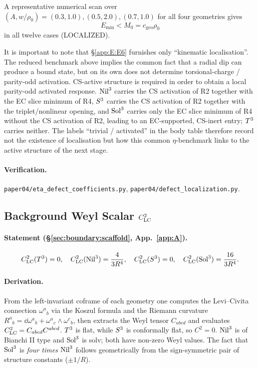 A representative numerical scan over $(A, w/\rho_0) = (0.3, 1.0), (0.5, 2.0),
(0.7, 1.0)$ for all four geometries gives
\begin{equation}
  E_{\min} < M_0 = c_{\mathrm{geo}}\rho_0
\end{equation}
in all twelve cases (LOCALIZED).

It is important to note that \S\ref{app:E:E6} furnishes only ``kinematic
localisation''.  The reduced benchmark above implies the common fact that
a radial dip can produce a bound state, but on its own does not determine
torsional-charge / parity-odd activation.  CS-active structure is required
in order to obtain a local parity-odd activated response.  $\mathrm{Nil}^3$
carries the CS activation of R2 together with the EC slice minimum of R4,
$S^3$ carries the CS activation of R2 together with the
triplet/nonlinear opening, and $\mathrm{Sol}^3$ carries only the EC slice
minimum of R4 without the CS activation of R2, leading to an
EC-supported, CS-inert entry; $T^3$ carries neither.  The labels
``trivial / activated'' in the body table therefore record not the existence
of localisation but how this common $\eta$-benchmark links to the active
structure of the next stage.

\paragraph{Verification.}
\texttt{paper04/eta\_defect\_coefficients.py},
\texttt{paper04/defect\_localization.py}.

\subsection{Background Weyl Scalar $C^2_{\mathrm{LC}}$}
\label{app:E:E7}

\paragraph{Statement (\S\ref{sec:boundary:scaffold}, App.~\ref{app:A}).}
\begin{equation}
  C^2_{\mathrm{LC}}(T^3) = 0, \quad
  C^2_{\mathrm{LC}}(\mathrm{Nil}^3) = \frac{4}{3R^4}, \quad
  C^2_{\mathrm{LC}}(S^3) = 0, \quad
  C^2_{\mathrm{LC}}(\mathrm{Sol}^3) = \frac{16}{3R^4}.
\end{equation}

\paragraph{Derivation.}
From the left-invariant coframe of each geometry one computes the
Levi--Civita connection $\omega^a{}_b$ via the Koszul formula and the
Riemann curvature
$R^a{}_b = \dd\omega^a{}_b + \omega^a{}_c\wedge\omega^c{}_b$, then extracts
the Weyl tensor $C_{abcd}$ and evaluates
$C^2_{\mathrm{LC}} = C_{abcd}C^{abcd}$.  $T^3$ is flat, while $S^3$ is
conformally flat, so $C^2 = 0$.  $\mathrm{Nil}^3$ is of Bianchi II type and
$\mathrm{Sol}^3$ is solv; both have non-zero Weyl values.  The fact that
$\mathrm{Sol}^3$ is \emph{four times} $\mathrm{Nil}^3$ follows geometrically from the
sign-symmetric pair of structure constants ($\pm 1/R$).

